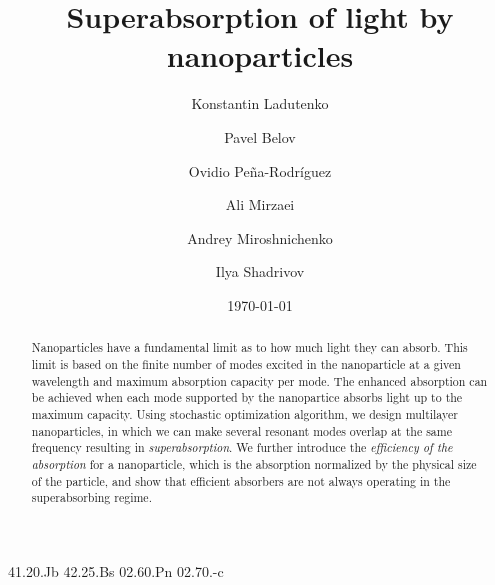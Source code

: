 \documentclass[aps,prl,twocolumn,showpacs,superscriptaddress,groupedaddress]{revtex4-1}  %
\begin{document}
\title{Superabsorption of light by nanoparticles}

\author{Konstantin Ladutenko}  


\author{Pavel Belov} 

\author{Ovidio Pe\~{n}a-Rodr\'{i}guez} 

\author{Ali Mirzaei} \author{Andrey Miroshnichenko} \author{Ilya
  Shadrivov} 

\date{\today}
\begin{abstract}
  Nanoparticles have a fundamental limit as to how much light they can
  absorb. This limit is based on the finite number of modes excited in
  the nanoparticle at a given wavelength and maximum absorption
  capacity per mode. The enhanced absorption can be achieved when each
  mode supported by the nanopartice absorbs light up to the maximum
  capacity. Using stochastic optimization algorithm, we design
  multilayer nanoparticles, in which we can make several resonant
  modes overlap at the same frequency resulting in {\it
    superabsorption}.  We further introduce the {\it efficiency of the
    absorption} for a nanoparticle, which is the absorption normalized
  by the physical size of the particle, and show that efficient
  absorbers are not always operating in the superabsorbing regime.
\end{abstract}


\pacs%
{41.20.Jb 42.25.Bs 02.60.Pn 02.70.-c}
\end{document}
